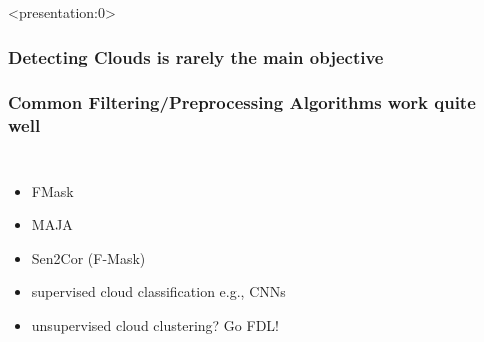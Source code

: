 \documentclass[%
  aspectratio=169,
  9pt,
ngerman,
  light,
  mathserif,
  professionalfont,
  affiliationintitlepagehead,
  titlegraphic,
   affiliation,
   navigationbar,
  progressbar,
]{beamer}
\begin{document}
%		




\begin{frame}<presentation:0>

\frametitle{Detecting Clouds is rarely the main objective}
\LARGE
\centering\figcloudfilteringpipeline

\end{frame}

%


%
%

%
%
%
%
%

\begin{frame}
	\frametitle{Common Filtering/Preprocessing Algorithms work quite well}
	
	\begin{columns}
		\begin{itemize}
			\item FMask
			\item MAJA
			\item Sen2Cor (F-Mask)
			\item supervised cloud classification e.g., CNNs
			\item unsupervised cloud clustering? {\small Go FDL!}
		\end{itemize}
	
	\end{columns}
\end{frame}

%
%
\end{document}
